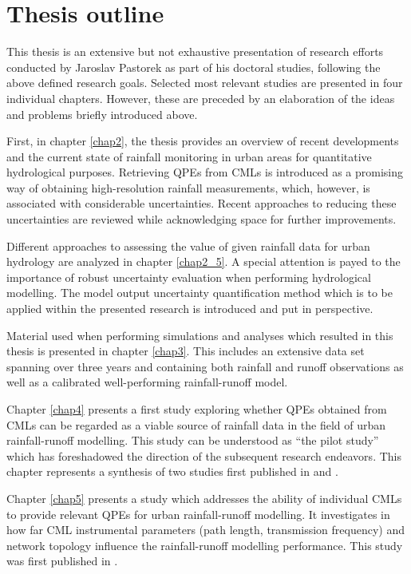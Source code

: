 \documentclass{ctuthesis}\usepackage[]{graphicx}\usepackage[]{color}
\begin{document}
\section{Thesis outline}
This thesis is an extensive but not exhaustive presentation of research efforts conducted by Jaroslav Pastorek as part of his doctoral studies, following the above defined research goals. Selected most relevant studies are presented in four individual chapters. However, these are preceded by an elaboration of the ideas and problems briefly introduced above.  

First, in chapter \ref{chap2}, the thesis provides an overview of recent developments and the current state of rainfall monitoring in urban areas for quantitative hydrological purposes. Retrieving QPEs from CMLs is introduced as a promising way of obtaining high-resolution rainfall measurements, which, however, is associated with considerable uncertainties. Recent approaches to reducing these uncertainties are reviewed while acknowledging space for further improvements.

Different approaches to assessing the value of given rainfall data for urban hydrology are analyzed in chapter \ref{chap2_5}. A special attention is payed to the importance of robust uncertainty evaluation when performing hydrological modelling. The model output uncertainty quantification method which is to be applied within the presented research is introduced and put in perspective. 

Material used when performing simulations and analyses which resulted in this thesis is presented in chapter \ref{chap3}. This includes an extensive data set spanning over three years and containing both rainfall and runoff observations as well as a calibrated well-performing rainfall-runoff model.

Chapter \ref{chap4} presents a first study exploring whether QPEs obtained from CMLs can be regarded as a viable source of rainfall data in the field of urban rainfall-runoff modelling. This study can be understood as \enquote{the pilot study} which has foreshadowed the direction of the subsequent research endeavors. This chapter represents a synthesis of two studies first published in \cite{pastorekReliabilityMicrowaveLink2017} and \cite{pastorekPosouzeniSrazkovychDat2018}.

Chapter \ref{chap5} presents a study which addresses the ability of individual CMLs to provide relevant QPEs for urban rainfall-runoff modelling. It investigates in how far CML instrumental parameters (path length, transmission frequency) and network topology influence the rainfall-runoff modelling performance. This study was first published in \cite{pastorekCommercialMicrowaveLinks2019}.
\end{document}
